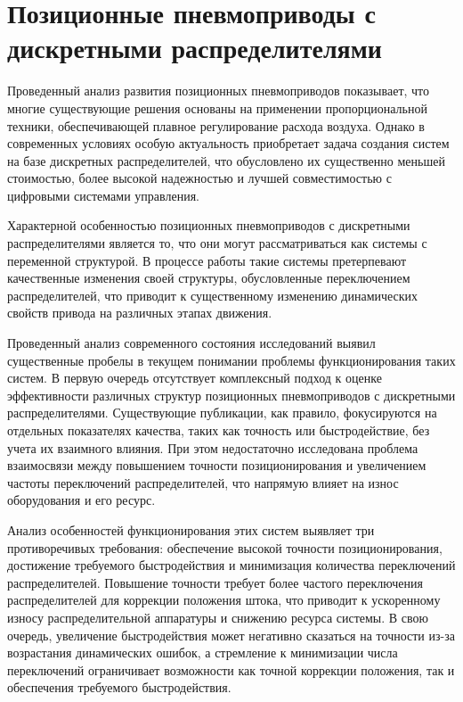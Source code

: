 \section{Позиционные пневмоприводы с дискретными распределителями}

Проведенный анализ развития позиционных пневмоприводов показывает, что многие существующие 
решения основаны на применении пропорциональной техники,
обеспечивающей плавное регулирование расхода воздуха. Однако в современных условиях особую актуальность приобретает
задача создания систем на базе дискретных распределителей, что обусловлено их существенно меньшей
стоимостью, более высокой надежностью и лучшей совместимостью с цифровыми системами управления.

Характерной особенностью позиционных пневмоприводов с дискретными распределителями является то, что они могут рассматриваться как системы с переменной
структурой. В процессе работы такие системы претерпевают качественные изменения своей структуры, обусловленные переключением распределителей, что приводит к
существенному изменению динамических свойств привода на различных этапах движения.

Проведенный анализ современного состояния исследований выявил существенные пробелы в текущем понимании проблемы функционирования
таких систем. В первую очередь отсутствует комплексный подход к оценке эффективности различных структур позиционных пневмоприводов с дискретными распределителями.
Существующие публикации, как правило, фокусируются на отдельных показателях качества, таких как точность или быстродействие, без учета их взаимного влияния. При этом
недостаточно исследована проблема взаимосвязи между повышением точности позиционирования и увеличением частоты переключений распределителей, что напрямую влияет на износ оборудования и его ресурс.

Анализ особенностей функционирования этих систем выявляет три противоречивых требования: обеспечение высокой точности
позиционирования, достижение требуемого быстродействия и минимизация количества переключений распределителей. Повышение точности
требует более частого переключения распределителей для коррекции положения штока, что приводит к ускоренному износу распределительной аппаратуры и снижению ресурса системы.
В свою очередь, увеличение быстродействия может негативно сказаться на точности из-за возрастания динамических ошибок, а стремление к минимизации числа переключений ограничивает
возможности как точной коррекции положения, так и обеспечения требуемого быстродействия.

